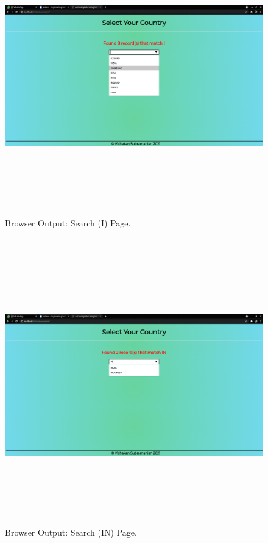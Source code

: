 \documentclass[12pt, a4]{article}
\begin{document}
\subsection*{}
\begin{figure}[h]
\centering
\caption{Browser Output: Search (I) Page.}
\includegraphics[height=12cm, width=18cm]{Output/Autocomplete2.png}
\end{figure}

\newpage
\subsection*{}
\begin{figure}[h]
\centering
\caption{Browser Output: Search (IN) Page.}
\includegraphics[height=12cm, width=18cm]{Output/Autocomplete3.png}
\end{figure}
\end{document}
